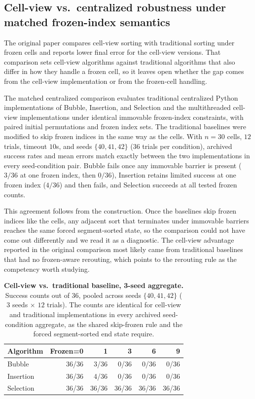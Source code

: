 \documentclass[11pt]{article}
\begin{document}
\subsection{Cell-view vs.\ centralized robustness under matched frozen-index semantics}
The original paper compares cell-view sorting with traditional sorting under frozen cells and
reports lower final error for the cell-view versions. That comparison sets cell-view algorithms
against traditional algorithms that also differ in how they handle a frozen cell, so it leaves open
whether the gap comes from the cell-view implementation or from the frozen-cell handling.

The matched centralized comparison evaluates traditional centralized Python implementations of
Bubble, Insertion, and Selection and the multithreaded cell-view implementations under identical
immovable frozen-index constraints, with paired initial permutations and frozen index sets. The
traditional baselines were modified to skip frozen indices in the same way as the cells. With
$n=30$ cells, $12$ trials, timeout $10$s, and seeds $\{40,41,42\}$ (36 trials per condition),
archived success rates and mean errors match exactly between the two implementations in every
seed-condition pair. Bubble fails once any immovable barrier is present ($3/36$ at one frozen
index, then $0/36$), Insertion retains limited success at one frozen index ($4/36$) and then fails,
and Selection succeeds at all tested frozen counts.

This agreement follows from the construction. Once the baselines skip frozen indices like the
cells, any adjacent sort that terminates under immovable barriers reaches the same forced
segment-sorted state, so the comparison could not have come out differently and we read it as a
diagnostic. The cell-view advantage reported in the original comparison most likely came from
traditional baselines that had no frozen-aware rerouting, which points to the rerouting rule as
the competency worth studying.

\begin{table}[t]
  \centering
  \small
  \setlength{\tabcolsep}{4pt}
  \begin{tabular}{@{}lrrrrr@{}}
    \toprule
    Algorithm & Frozen=0 & 1 & 3 & 6 & 9 \\
    \midrule
    Bubble & 36/36 & 3/36 & 0/36 & 0/36 & 0/36 \\
    Insertion & 36/36 & 4/36 & 0/36 & 0/36 & 0/36 \\
    Selection & 36/36 & 36/36 & 36/36 & 36/36 & 36/36 \\
    \bottomrule
  \end{tabular}
  \caption{\textbf{Cell-view vs.\ traditional baseline, 3-seed aggregate.}
  Success counts out of $36$, pooled across seeds $\{40,41,42\}$ ($3$ seeds $\times$ $12$ trials).
  The counts are identical for cell-view and traditional implementations in every archived
  seed-condition aggregate, as the shared skip-frozen rule and the forced segment-sorted end state
  require.}
  \label{tab:exp14}
\end{table}
\end{document}
